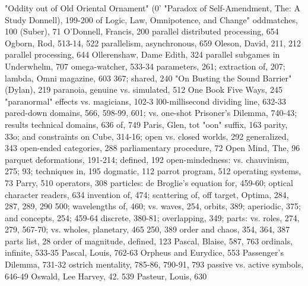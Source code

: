 "Oddity out of Old Oriental Ornament" (0'          "Paradox of Self-Amendment, The: A Study
Donnell), 199-200                                   of Logic, Law, Omnipotence, and Change"
oddmatches, 100                                    (Suber), 71
O'Donnell, Francis, 200                            parallel distributed processing, 654
Ogborn, Rod, 513-14, 522                           parallelism, asynchronous, 659
Oleson, David, 211, 212                            parallel processing, 644
Ollerenshaw, Dame Edith, 324                       parallel subgames in Underwhelm, 707
omega-watcher, 533-34                              parameters, 261; extraction of, 207; lambda,
Omni magazine, 603                                  367; shared, 240
"On Busting the Sound Barrier" (Dylan), 219        paranoia, genuine vs. simulated, 512
One Book Five Ways, 245                            "paranormal" effects vs. magicians, 102-3
l00-millisecond dividing line, 632-33              pared-down domains, 566, 598-99, 601; vs.
one-shot Prisoner's Dilemma, 740-43; results        technical domains, 636
 of, 749                                           Paris, Glen, tot
"oon" suffix, 163                                  parity, 33o; and constraints on Cube, 314-16;
open vs. closed worlds, 292                         generalized, 343
open-ended categories, 288                         parliamentary procedure, 72
Open Mind, The, 96                                 parquet deformations, 191-214; defined, 192
open-mindedness: vs. chauvinism, 275;               93; techniques in, 195
 dogmatic, 112                                     parrot program, 512
operating systems, 73                              Parry, 510
operators, 308                                     particles: de Broglie's equation for, 459-60;
optical character readers, 634                      invention of, 474; scattering of, off target,
Optima, 284, 287, 289, 290                          500; wavelengths of, 460; vs. waves, 254,
orbits, 389; aperiodic, 375; and concepts, 254;     459-64
 discrete, 380-81; overlapping, 349;               parts: vs. roles, 274, 279, 567-70; vs. wholes,
 planetary, 465                                     250, 389
order and chaos, 354, 364, 387                     parts list, 28
order of magnitude, defined, 123                   Pascal, Blaise, 587, 763
ordinals, infinite, 533-35                         Pascal, Louis, 762-63
Orpheus and Eurydice, 553                          Passenger's Dilemma, 731-32
ostrich mentality, 785-86, 790-91, 793             passive vs. active symbols, 646-49
Oswald, Lee Harvey, 42. 539                        Pasteur, Louis, 630
